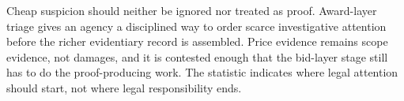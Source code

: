 Cheap suspicion should neither be ignored nor treated as proof.
Award-layer triage gives an agency a disciplined way to order
scarce investigative attention before the richer evidentiary
record is assembled. Price evidence remains scope evidence, not
damages, and it is contested enough that the bid-layer stage
still has to do the proof-producing work. The statistic indicates
where legal attention should start, not where legal
responsibility ends.
